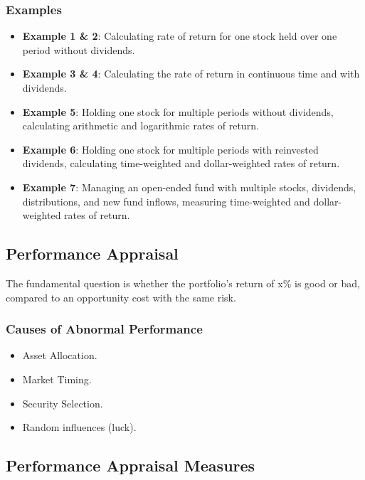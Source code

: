 \documentclass[
]{book}
\providecommand{\tightlist}{%
  \setlength{\itemsep}{0pt}\setlength{\parskip}{0pt}}
\begin{document}
\hypertarget{examples}{%
\subsubsection{Examples}\label{examples}}

\begin{itemize}
\tightlist
\item
  \textbf{Example 1 \& 2}: Calculating rate of return for one stock held over one period without dividends.
\item
  \textbf{Example 3 \& 4}: Calculating the rate of return in continuous time and with dividends.
\item
  \textbf{Example 5}: Holding one stock for multiple periods without dividends, calculating arithmetic and logarithmic rates of return.
\item
  \textbf{Example 6}: Holding one stock for multiple periods with reinvested dividends, calculating time-weighted and dollar-weighted rates of return.
\item
  \textbf{Example 7}: Managing an open-ended fund with multiple stocks, dividends, distributions, and new fund inflows, measuring time-weighted and dollar-weighted rates of return.
\end{itemize}

\hypertarget{performance-appraisal}{%
\subsection{Performance Appraisal}\label{performance-appraisal}}

The fundamental question is whether the portfolio's return of x\% is good or bad, compared to an opportunity cost with the same risk.

\hypertarget{causes-of-abnormal-performance}{%
\subsubsection{Causes of Abnormal Performance}\label{causes-of-abnormal-performance}}

\begin{itemize}
\tightlist
\item
  Asset Allocation.
\item
  Market Timing.
\item
  Security Selection.
\item
  Random influences (luck).
\end{itemize}

\hypertarget{performance-appraisal-measures}{%
\subsection{Performance Appraisal Measures}\label{performance-appraisal-measures}}
\end{document}
